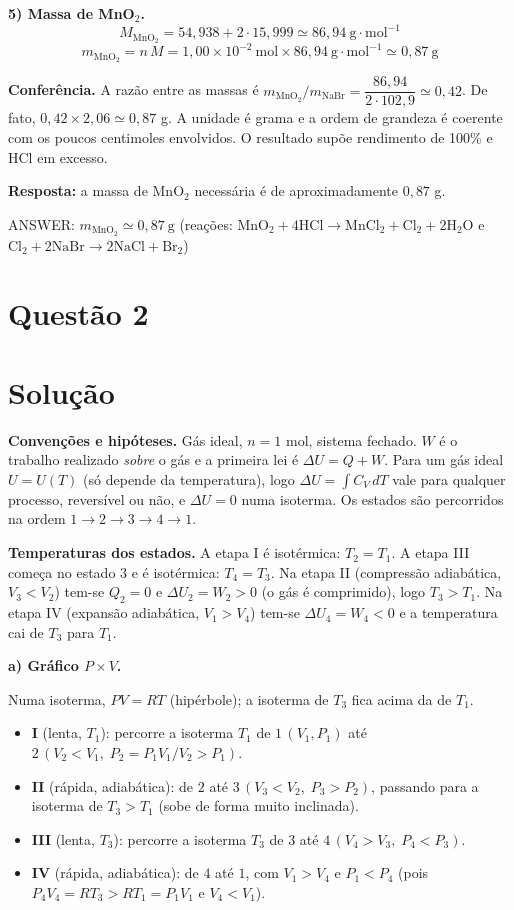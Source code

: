 \documentclass{article}%
\begin{document}
\textbf{5) Massa de MnO$_2$.}
\[
M_{\mathrm{MnO_2}} = 54{,}938 + 2\cdot 15{,}999 \simeq 86{,}94\ \mathrm{g\cdot mol^{-1}}
\]
\[
m_{\mathrm{MnO_2}} = n\,M = 1{,}00\times10^{-2}\ \mathrm{mol}\times 86{,}94\ \mathrm{g\cdot mol^{-1}} \simeq 0{,}87\ \mathrm{g}
\]

\textbf{Conferência.} A razão entre as massas é $m_{\mathrm{MnO_2}}/m_{\mathrm{NaBr}} = \dfrac{86{,}94}{2\cdot 102{,}9}\simeq 0{,}42$. De fato, $0{,}42\times 2{,}06 \simeq 0{,}87$ g. A unidade é grama e a ordem de grandeza é coerente com os poucos centimoles envolvidos. O resultado supõe rendimento de 100\% e HCl em excesso.

\textbf{Resposta:} a massa de MnO$_2$ necessária é de aproximadamente $0{,}87$ g.

ANSWER: $m_{\mathrm{MnO_2}} \simeq 0{,}87\ \mathrm{g}$ (reações: $\mathrm{MnO_2 + 4HCl \to MnCl_2 + Cl_2 + 2H_2O}$ e $\mathrm{Cl_2 + 2NaBr \to 2NaCl + Br_2}$)%
\newpage%
\section*{Questão 2}

\section*{Solução}

\textbf{Convenções e hipóteses.} Gás ideal, $n=1$ mol, sistema fechado. $W$ é o trabalho realizado \emph{sobre} o gás e a primeira lei é $\Delta U=Q+W$. Para um gás ideal $U=U(T)$ (só depende da temperatura), logo $\Delta U=\int C_V\,dT$ vale para qualquer processo, reversível ou não, e $\Delta U=0$ numa isoterma. Os estados são percorridos na ordem $1\to2\to3\to4\to1$.

\textbf{Temperaturas dos estados.} A etapa I é isotérmica: $T_2=T_1$. A etapa III começa no estado 3 e é isotérmica: $T_4=T_3$. Na etapa II (compressão adiabática, $V_3<V_2$) tem-se $Q_2=0$ e $\Delta U_2=W_2>0$ (o gás é comprimido), logo $T_3>T_1$. Na etapa IV (expansão adiabática, $V_1>V_4$) tem-se $\Delta U_4=W_4<0$ e a temperatura cai de $T_3$ para $T_1$.

\medskip\noindent\textbf{a) Gráfico $P\times V$.}

Numa isoterma, $PV=RT$ (hipérbole); a isoterma de $T_3$ fica acima da de $T_1$.

\begin{itemize}
\item \textbf{I} (lenta, $T_1$): percorre a isoterma $T_1$ de $1\,(V_1,P_1)$ até $2\,(V_2<V_1,\;P_2=P_1V_1/V_2>P_1)$.
\item \textbf{II} (rápida, adiabática): de $2$ até $3\,(V_3<V_2,\;P_3>P_2)$, passando para a isoterma de $T_3>T_1$ (sobe de forma muito inclinada).
\item \textbf{III} (lenta, $T_3$): percorre a isoterma $T_3$ de $3$ até $4\,(V_4>V_3,\;P_4<P_3)$.
\item \textbf{IV} (rápida, adiabática): de $4$ até $1$, com $V_1>V_4$ e $P_1<P_4$ (pois $P_4V_4=RT_3>RT_1=P_1V_1$ e $V_4<V_1$).
\end{itemize}
\end{document}
